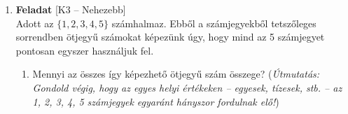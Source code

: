 \documentclass[12pt,a4paper]{article}
\begin{document}
\begin{enumerate}[label=\arabic*., leftmargin=*]
    \item \textbf{Feladat} \textsf{\small [K3 – Nehezebb]} \\
    Adott az $\{1, 2, 3, 4, 5\}$ számhalmaz. Ebből a számjegyekből tetszőleges sorrendben ötjegyű számokat képezünk úgy, hogy mind az 5 számjegyet pontosan egyszer használjuk fel.
    \begin{enumerate}[label=\alph*)]
        \item Mennyi az összes így képezhető ötjegyű szám összege? (\emph{Útmutatás: Gondold végig, hogy az egyes helyi értékeken – egyesek, tízesek, stb. – az 1, 2, 3, 4, 5 számjegyek egyaránt hányszor fordulnak elő!})
    \end{enumerate}

\end{enumerate}
\end{document}
